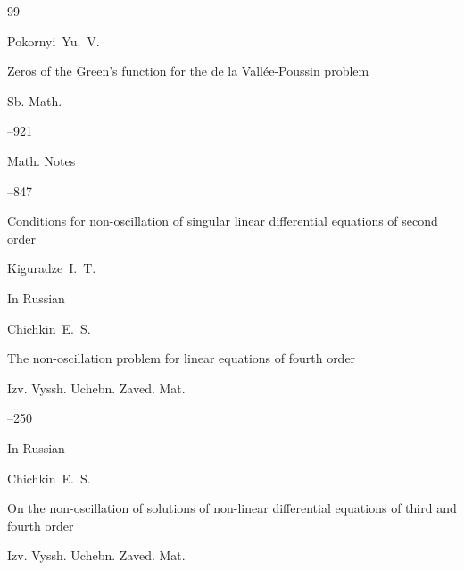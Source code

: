 \begin{thebibliography}{99}

\by Pokornyi~Yu.~V.

\paper Zeros of the Green's function for the de la Vall\'ee-Poussin problem

\jour Sb. Math.




--921







\jour Math. Notes




--847


\paper Conditions for non-oscillation of singular linear differential equations of second order

\by Kiguradze~I.~T.




\lang In Russian

\by Chichkin~E.~S.

\paper The non-oscillation problem for linear equations of fourth order

\jour Izv. Vyssh. Uchebn. Zaved. Mat.



--250






\lang In Russian

\by Chichkin~E.~S.

\paper On the non-oscillation of solutions of non-linear differential equations of third and fourth order

\jour Izv. Vyssh. Uchebn. Zaved. Mat.


\end{thebibliography}
